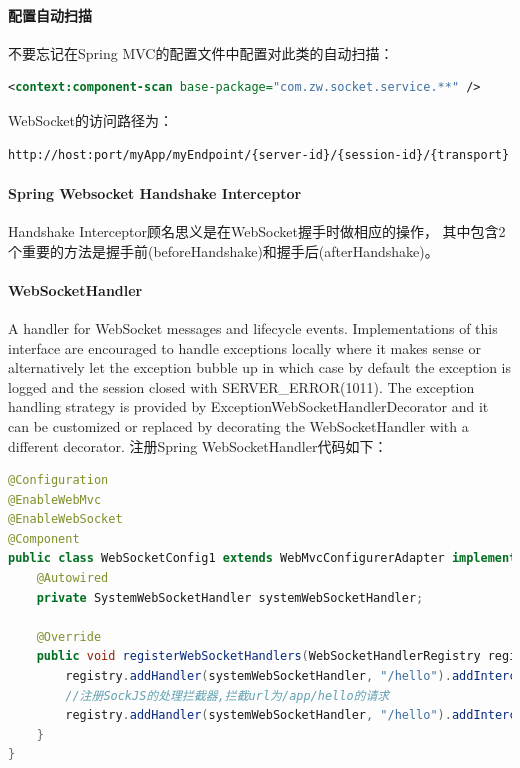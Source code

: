 \documentclass{book}
\begin{document}
\paragraph{配置自动扫描}

不要忘记在Spring MVC的配置文件中配置对此类的自动扫描：

\begin{lstlisting}[language=XML]
<context:component-scan base-package="com.zw.socket.service.**" />
\end{lstlisting}

WebSocket的访问路径为：

\begin{lstlisting}[language=HTML]
http://host:port/myApp/myEndpoint/{server-id}/{session-id}/{transport}
\end{lstlisting}

\paragraph{Spring Websocket Handshake Interceptor}

Handshake Interceptor顾名思义是在WebSocket握手时做相应的操作，
其中包含2个重要的方法是握手前(beforeHandshake)和握手后(afterHandshake)。

\paragraph{WebSocketHandler}
A handler for WebSocket messages and lifecycle events.
Implementations of this interface are encouraged to handle 
exceptions locally where it makes sense or alternatively let 
the exception bubble up in which case by default the exception 
is logged and the session closed with SERVER\_ERROR(1011). 
The exception handling strategy is provided by ExceptionWebSocketHandlerDecorator 
and it can be customized or replaced by decorating the WebSocketHandler with a different decorator.
注册Spring WebSocketHandler代码如下：

\begin{lstlisting}[language=Java]
@Configuration
@EnableWebMvc
@EnableWebSocket
@Component
public class WebSocketConfig1 extends WebMvcConfigurerAdapter implements WebSocketConfigurer {	
	@Autowired
	private SystemWebSocketHandler systemWebSocketHandler;
	
	@Override
	public void registerWebSocketHandlers(WebSocketHandlerRegistry registry) {
		registry.addHandler(systemWebSocketHandler, "/hello").addInterceptors(new WebSocketHandshakeInterceptor());
		//注册SockJS的处理拦截器,拦截url为/app/hello的请求
		registry.addHandler(systemWebSocketHandler, "/hello").addInterceptors(new WebSocketHandshakeInterceptor()).withSockJS();
	}	
}
\end{lstlisting}
\end{document}
